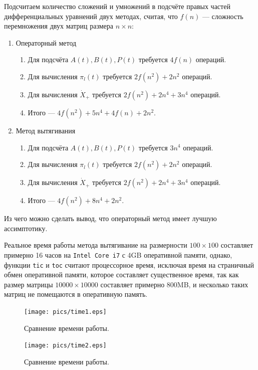 \documentclass[12pt]{article}
\theoremstyle{rusdef}
\begin{document}
Подсчитаем количество сложений и умножений в подсчёте правых частей дифференциальных уравнений двух методах, считая, что $f(n)$ --- сложность перемножения двух матриц размера $n \times n$:
\begin{enumerate}
\item Операторный метод
\begin{enumerate}
\item Для подсчёта $A(t), B(t), P(t)$ требуется $4f(n)$ операций.
\item Для вычисления $\pi_l(t)$ требуется $2f(n^2) + 2n^2$ операций.
\item Для вычисления $\dot{X}_+$ требуется $2f(n^2) + 2n^4 + 3n^4$ операций.
\item Итого --- $4f(n^2) + 5n^4 + 4f(n) + 2n^2$.
\end{enumerate}
\item Метод вытягивания
\begin{enumerate}
\item Для подсчёта $A(t), B(t), P(t)$ требуется $3n^4$ операций.
\item Для вычисления $\pi_l(t)$ требуется $2f(n^2) + 2n^2$ операций.
\item Для вычисления $\dot{X}_+$ требуется $2f(n^2) + 2n^4 + 3n^4$ операций.
\item Итого --- $4f(n^2) + 8n^4 + 2n^2$.
\end{enumerate}
\end{enumerate}

Из чего можно сделать вывод, что операторный метод имеет лучшую ассимптотику.

Реальное время работы метода вытягивание на размерности $100 \times 100$ составляет примерно 16 часов на \texttt{Intel Core i7} с 4GB оперативной памяти, однако, функции \texttt{tic} и \texttt{toc} считают процессорное время, исключая время на страничный обмен оперативной памяти, которое составляет существенное время, так как размер матрицы $10000 \times 10000$ составляет примерно 800MB, и несколько таких матриц не помещаются в оперативную память.

\begin{figure}[p]\label{time1}
	\centering
	\texttt{[image: pics/time1.eps]}
	\caption{Сравнение времени работы.}
\end{figure}

\begin{figure}[p]
	\centering
	\texttt{[image: pics/time2.eps]}
	\caption{Сравнение времени работы.}
	\label{time2}
\end{figure}
\end{document}
